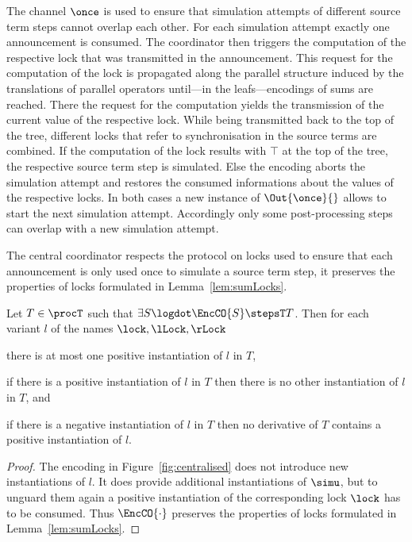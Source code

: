 \documentclass[]{eptcs}
\begin{document}
The channel $ \once $ is used to ensure that simulation attempts of different source term steps cannot overlap each other. For each simulation attempt exactly one announcement is consumed. The coordinator then triggers the computation of the respective lock that was transmitted in the announcement. This request for the computation of the lock is propagated along the parallel structure induced by the translations of parallel operators until---in the leafs---encodings of sums are reached. There the request for the computation yields the transmission of the current value of the respective lock. While being transmitted back to the top of the tree, different locks that refer to synchronisation in the source terms are combined. If the computation of the lock results with $ \top $ at the top of the tree, the respective source term step is simulated. Else the encoding aborts the simulation attempt and restores the consumed informations about the values of the respective locks. In both cases a new instance of $ \Out{\once}{} $ allows to start the next simulation attempt. Accordingly only some post-processing steps can overlap with a new simulation attempt.

The central coordinator respects the protocol on locks used to ensure that each announcement is only used once to simulate a source term step, \ie it preserves the properties of locks formulated in Lemma~\ref{lem:sumLocks}.

\begin{prop}
	Let $ T \in \procT $ such that $ \exists S\logdot \EncCO{S} \stepsT T $. Then for each variant $ l $ of the names $ \lock, \lLock, \rLock $
	\begin{compactenum}
		\item there is at most one positive instantiation of $ l $ in $ T $,
		\item if there is a positive instantiation of $ l $ in $ T $ then there is no other instantiation of $ l $ in $ T $, and
		\item if there is a negative instantiation of $ l $ in $ T $ then no derivative of $ T $ contains a positive instantiation of $ l $.
	\end{compactenum}
	\label{prop:sumLocksCentral}
\end{prop}

\begin{proof}
	The encoding in Figure~\ref{fig:centralised} does not introduce new instantiations of $ l $. It does provide additional instantiations of $ \simu $, but to unguard them again a positive instantiation of the corresponding lock $ \lock $ has to be consumed. Thus $ \EncCO{\cdot} $ preserves the properties of locks formulated in Lemma~\ref{lem:sumLocks}.
\end{proof}
\end{document}
